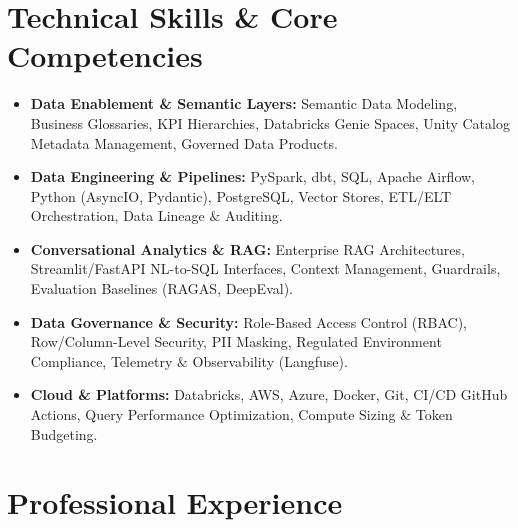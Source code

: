 \documentclass[a4paper,10pt]{article}
\begin{document}
\section{Technical Skills \& Core Competencies}
\begin{itemize}[leftmargin=1.2em, itemsep=2pt]
  \item \textbf{Data Enablement \& Semantic Layers:} Semantic Data Modeling, Business Glossaries, KPI Hierarchies, Databricks Genie Spaces, Unity Catalog Metadata Management, Governed Data Products.
  \item \textbf{Data Engineering \& Pipelines:} PySpark, dbt, SQL, Apache Airflow, Python (AsyncIO, Pydantic), PostgreSQL, Vector Stores, ETL/ELT Orchestration, Data Lineage $\&$ Auditing.
  \item \textbf{Conversational Analytics \& RAG:} Enterprise RAG Architectures, Streamlit/FastAPI NL-to-SQL Interfaces, Context Management, Guardrails, Evaluation Baselines (RAGAS, DeepEval).
  \item \textbf{Data Governance \& Security:} Role-Based Access Control (RBAC), Row/Column-Level Security, PII Masking, Regulated Environment Compliance, Telemetry $\&$ Observability (Langfuse).
  \item \textbf{Cloud \& Platforms:} Databricks, AWS, Azure, Docker, Git, CI/CD GitHub Actions, Query Performance Optimization, Compute Sizing $\&$ Token Budgeting.
\end{itemize}

\section{Professional Experience}
\end{document}
